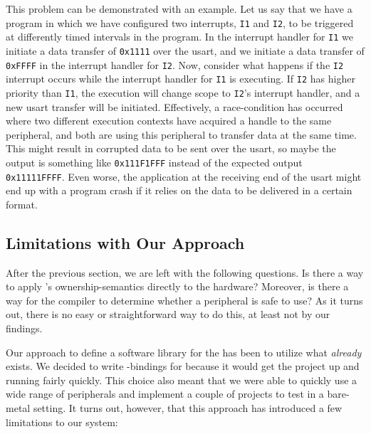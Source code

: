 This problem can be demonstrated with an example.
Let us say that we have a program in which we have configured two interrupts, \texttt{I1} and \texttt{I2}, to be triggered at differently timed intervals in the program.
In the interrupt handler for \texttt{I1} we initiate a data transfer of \texttt{0x1111} over the \gls{usart}, and we initiate a data transfer of \texttt{0xFFFF} in the interrupt handler for \texttt{I2}.
Now, consider what happens if the \texttt{I2} interrupt occurs while the interrupt handler for \texttt{I1} is executing.
If \texttt{I2} has higher priority than \texttt{I1}, the execution will change scope to \texttt{I2}'s interrupt handler, and a new \gls{usart} transfer will be initiated.
Effectively, a race-condition has occurred where two different execution contexts have acquired a handle to the same peripheral, and both are using this peripheral to transfer data at the same time.
This might result in corrupted data to be sent over the \gls{usart}, so maybe the output is something like \texttt{0x111F1FFF} instead of the expected output \texttt{0x11111FFFF}.
Even worse, the application at the receiving end of the \gls{usart} might end up with a program crash if it relies on the data to be delivered in a certain format.

\subsection{Limitations with Our Approach}

After the previous section, we are left with the following questions.
Is there a way to apply {\rust}'s ownership-semantics directly to the hardware?
Moreover, is there a way for the {\rust} compiler to determine whether a peripheral is safe to use?
As it turns out, there is no easy or straightforward way to do this, at least not by our findings.

Our approach to define a software library for the {\gecko} has been to utilize what \emph{already} exists.
We decided to write {\rust}-bindings for {\emlib} because it would get the project up and running fairly quickly.
This choice also meant that we were able to quickly use a wide range of peripherals and implement a couple of projects to test {\rust} in a bare-metal setting.
It turns out, however, that this approach has introduced a few limitations to our system:

